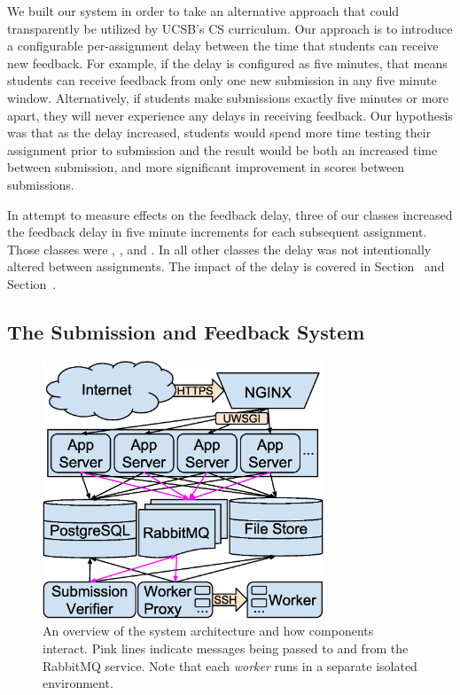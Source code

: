 We built our system in order to take an alternative approach that could
transparently be utilized by UCSB's CS curriculum. Our approach is to introduce
a configurable per-assignment delay between the time that students can receive
new feedback. For example, if the delay is configured as five minutes, that
means students can receive feedback from only one new submission in any five
minute window. Alternatively, if students make submissions exactly five minutes
or more apart, they will never experience any delays in receiving feedback. Our
hypothesis was that as the delay increased, students would spend more time
testing their assignment prior to submission and the result would be both an
increased time between submission, and more significant improvement in scores
between submissions.

In attempt to measure effects on the feedback delay, three of our classes
increased the feedback delay in five minute increments for each subsequent
assignment. Those classes were , , and . In
all other classes the delay was not intentionally altered between
assignments. The impact of the delay is covered in
Section~ and Section~.


\subsection{The Submission and Feedback System}

\begin{figure}[!t]
\centering \includegraphics[width=3.3in]{graphs/architecture.eps}
\caption{An overview of the system architecture and how components
  interact. Pink lines indicate messages being passed to and from the RabbitMQ
  service. Note that each \emph{worker} runs in a separate isolated
  environment.}
\end{figure}

